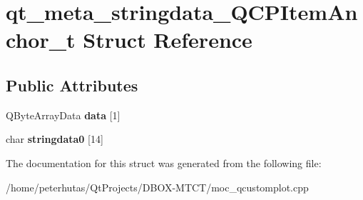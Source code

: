 \hypertarget{structqt__meta__stringdata___q_c_p_item_anchor__t}{}\section{qt\+\_\+meta\+\_\+stringdata\+\_\+\+Q\+C\+P\+Item\+Anchor\+\_\+t Struct Reference}
\label{structqt__meta__stringdata___q_c_p_item_anchor__t}
\subsection*{Public Attributes}
\begin{DoxyCompactItemize}
\item 
\mbox{\label{structqt__meta__stringdata___q_c_p_item_anchor__t_ab593c041f966a8f093e032b5b552399d}} 
Q\+Byte\+Array\+Data {\bfseries data} \mbox{[}1\mbox{]}
\item 
\mbox{\label{structqt__meta__stringdata___q_c_p_item_anchor__t_aafbba7dee657bf2d44a9148e9e2c6b48}} 
char {\bfseries stringdata0} \mbox{[}14\mbox{]}
\end{DoxyCompactItemize}


The documentation for this struct was generated from the following file\+:\begin{DoxyCompactItemize}
\item 
/home/peterhutas/\+Qt\+Projects/\+D\+B\+O\+X-\/\+M\+T\+C\+T/moc\+\_\+qcustomplot.\+cpp\end{DoxyCompactItemize}
